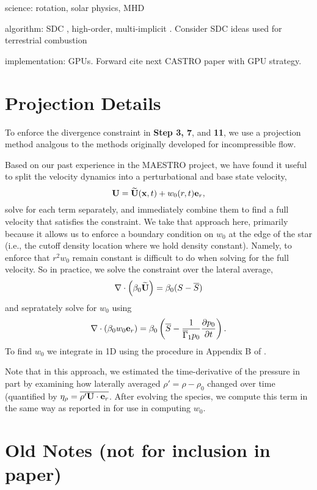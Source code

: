 \documentclass{aastex62}
\newcommand{\eb}{{\bf{e}}}
\newcommand{\Ub}{{\bf{U}}}
\newcommand{\Ubt}{\widetilde{\Ub}}
\newcommand{\xb}{{\bf{x}}}
\newcommand{\gammaonebar}{\overline{\Gamma}_1}
\begin{document}
science: rotation, solar physics, MHD

algorithm: SDC \cite{dutt2000spectral}, high-order, multi-implicit \cite{bourlioux2003high}.
Consider SDC ideas used for terrestrial combustion \cite{pazner2016high,nonaka2018conservative}

implementation: GPUs.  Forward cite next CASTRO paper with GPU strategy.

\appendix
\section{Projection Details}
To enforce the divergence constraint in {\bf Step 3, 7}, and {\bf 11}, we use a projection method analgous to the methods originally developed for incompressible flow.

Based on our past experience in the MAESTRO project, we have found it useful to split the velocity dynamics into a perturbational and base state velocity,
\begin{equation}
\Ub = \Ubt(\xb,t) + w_0(r,t)\eb_r,
\end{equation}
solve for each term separately, and immediately combine them to find a full velocity that satisfies the constraint.  We take that approach here, primarily because it allows us to enforce a boundary condition on $w_0$ at the edge of the star (i.e., the cutoff density location where we hold density constant).  Namely, to enforce that $r^2 w_0$ remain constant is difficult to do when solving for the full velocity.  So in practice, we solve the constraint over the lateral average,
\begin{equation}
\nabla\cdot\left(\beta_0\Ubt\right) = \beta_0(S-\overline{S})
\end{equation}
and sepratately solve for $w_0$ using 
\begin{equation}
\nabla\cdot(\beta_0w_0\eb_r) = \beta_0\left(\overline{S} - \frac{1}{\gammaonebar p_0}\frac{\partial p_0}{\partial t}\right).
\end{equation}
To find $w_0$ we integrate in 1D using the procedure in Appendix B of \cite{MAESTRO_V}.

Note that in this approach, we estimated the time-derivative of the pressure in part by examining how laterally averaged $\rho'=\rho-\rho_0$ changed over time (quantified by $\eta_\rho = \overline{\rho'\Ub\cdot\eb_r}$.  After evolving the species, we compute this term in the same way as reported in \cite{MAESTRO_V} for use in computing $w_0$.

\section{Old Notes (not for inclusion in paper)}
\end{document}
